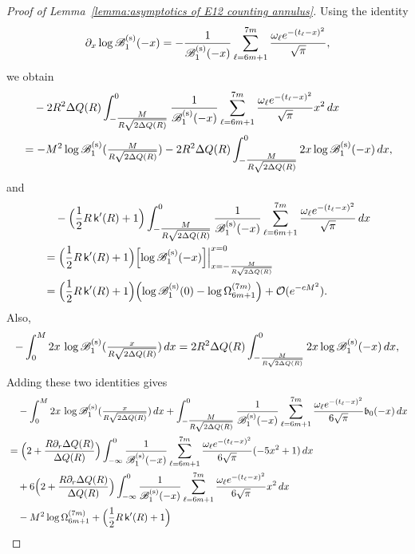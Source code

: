 \documentclass[a4paper]{article}
\numberwithin{equation}{section}
\begin{document}
\begin{proof}[Proof of Lemma~\ref{lemma:asymptotics of E12 counting annulus}]

Using the identity
\[
\partial_x\log\mathscr{B}_1^{(\rm s)}(-x)
=
-\frac{1}{\mathscr{B}_1^{(\rm s)}(-x)}\sum_{\ell=6m+1}^{7m}\frac{\omega_{\ell}e^{-(t_{\ell}-x)^2}}{\sqrt{\pi}},
\]
we obtain 
\begin{align*}
&\quad -2R^2\Delta Q(R)
\int_{-\tfrac{M}{R\sqrt{2\Delta Q(R)}}}^{0}
\frac{1}{\mathscr{B}_1^{(\rm s)}(-x)}
\sum_{\ell=6m+1}^{7m}
\frac{\omega_{\ell}e^{-(t_{\ell}-x)^2}}{\sqrt{\pi}}
x^2
\,dx
\\
&=
-
M^2\log\mathscr{B}_1^{(\rm s)}(\tfrac{M}{R\sqrt{2\Delta Q(R)}})
-
2R^2\Delta Q(R)\int_{-\tfrac{M}{R\sqrt{2\Delta Q(R)}}}^{0}
2x\log\mathscr{B}_1^{(\rm s)}(-x)\,dx,
\end{align*}
and 
\begin{align*}
&\quad
-
\Bigl(\frac{1}{2}R\,\mathsf{k}'(R)+1\Bigr)
\int_{-\tfrac{M}{R\sqrt{2\Delta Q(R)}}}^{0}
\frac{1}{\mathscr{B}_1^{(\rm s)}(-x)}
\sum_{\ell=6m+1}^{7m}
\frac{\omega_{\ell}e^{-(t_{\ell}-x)^2}}{\sqrt{\pi}}
\,dx
\\
&=
\Bigl(\frac{1}{2}R\,\mathsf{k}'(R)+1\Bigr)
\Bigl[\log\mathscr{B}_1^{(\rm s)}(-x)\Bigr]\Bigr|_{x=-\frac{M}{R\sqrt{2\Delta Q(R)}}}^{x=0}
\\
&=
\Bigl(\frac{1}{2}R\,\mathsf{k}'(R)+1\Bigr)
\Bigl( 
\log\mathscr{B}_1^{(\rm s)}(0)
-\log\Omega_{6m+1}^{(7m)}
\Bigr)+\mathcal O(e^{-cM^2}). 
\end{align*}
Also,
\[
-\int_0^{M}2x\,\log\mathscr{B}_1^{(\rm s)}(\tfrac{x}{R\sqrt{2\Delta Q(R)}})\,dx
=
2R^2\Delta Q(R)\int_{-\frac{M}{R\sqrt{2\Delta Q(R)}}}^{0}2x\log\mathscr{B}_1^{(\rm s)}(-x)\,dx, 
\]
Adding these two identities gives
\begin{align*}
&\quad
-\int_0^{M}2x\,\log\mathscr{B}_1^{(\rm s)}(\tfrac{x}{R\sqrt{2\Delta Q(R)}})\,dx
+
\int_{-\tfrac{M}{R\sqrt{2\Delta Q(R)}}}^{0}
\frac{1}{\mathscr{B}_1^{(\rm s)}(-x)}
\sum_{\ell=6m+1}^{7m}
\frac{\omega_{\ell}e^{-(t_{\ell}-x)^2}}{6\sqrt{\pi}}
\mathfrak{b}_0(-x)
\,dx
\\
&=
\Bigl(
2+\frac{R\partial_r\Delta Q(R)}{\Delta Q(R)}
\Bigr)
\int_{-\infty}^{0}
\frac{1}{\mathscr{B}_1^{(\rm s)}(-x)}
\sum_{\ell=6m+1}^{7m}
\frac{\omega_{\ell}e^{-(t_{\ell}-x)^2}}{6\sqrt{\pi}}
(-5x^2+1)
\,dx
\\
&\quad
+6\Bigl(
2+\frac{R\partial_r\Delta Q(R)}{\Delta Q(R)}
\Bigr)
\int_{-\infty}^{0}
\frac{1}{\mathscr{B}_1^{(\rm s)}(-x)}
\sum_{\ell=6m+1}^{7m}
\frac{\omega_{\ell}e^{-(t_{\ell}-x)^2}}{6\sqrt{\pi}}
x^2
\,dx
\\
&\quad
-M^2\log\Omega_{6m+1}^{(7m)}
+\Bigl(\frac{1}{2}R\,\mathsf{k}'(R)+1\Bigr)

\end{align*}
\end{proof}
\end{document}
